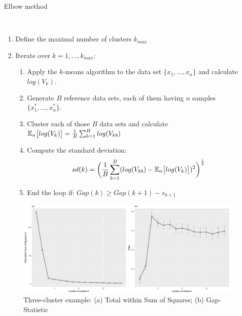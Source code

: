 \begin{algorithm} \label{alg:ellbow}
	\caption{Elbow method \cite{tibshirani2001estimating}}\label{alg:ellbow}
	\begin{algorithmic}
		\\
		\begin{enumerate}
			\item Define the maximal number of clusters $k_{max}$
			\item Iterate over $k = 1, ..., k_{max}$:
			\begin{enumerate}[label=\emph{\alph*})]
				\item \label{lev:ellbow_a} Apply the $k$-means algorithm to the data set $\{x_1, ..., x_n\}$ and calculate $log(V_k)$.
				\item \label{lev:ellbow_b} Generate $B$ reference data sets, each of them having $n$ samples $\{x_1^*, ..., x_n^*\}$.
				\item \label{lev:ellbow_c} Cluster each of those $B$ data sets and calculate $\mathbb{E}_n\big[log(V_k) \big] = \frac{1}{B} \sum_{b=1}^B log(V_{kb})$ 
				\item \label{lev:ellbow_d} Compute the standard deviation: 
					\begin{equation*}
						sd(k) = \bigg(\frac{1}{B}\sum_{b=1}^B(log(V_{kb})-\mathbb{E}_n\big[log(V_k) \big])^2\bigg)^\frac{1}{2}
					\end{equation*}
				\item \label{lev:ellbow_e} End the loop if: $Gap(k) \geq Gap(k+1) - s_{k+1}$ 
			\end{enumerate}
		\end{enumerate}
	\end{algorithmic}
\end{algorithm}

\begin{figure}
	\centering
	\includegraphics[width=\textwidth]{figures/chapter_k_means/gap_withinSS}
	\caption{Three-cluster example: (a) Total within Sum of Squares; (b) Gap-Statistic}
	\label{fig:gap_statistics}
\end{figure}

